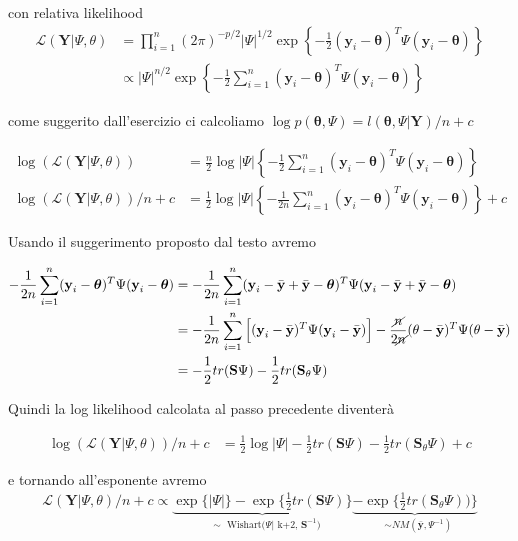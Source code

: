 con relativa likelihood
\begin{align*}
\mathcal{L}(\textbf{Y}|\Psi,\theta) &= \prod_{i=1}^n(2\pi)^{-p/2}|\Psi|^{1/2}\exp\left\{-\frac{1}{2}(\textbf{y}_i-\boldsymbol{\theta})^T\Psi(\textbf{y}_i-\boldsymbol{\theta})\right\}\\
&\propto |\Psi|^{n/2}\exp\left\{-\frac{1}{2}\sum_{i=1}^n(\textbf{y}_i-\boldsymbol{\theta})^T\Psi(\textbf{y}_i-\boldsymbol{\theta})\right\}
\end{align*}

come suggerito dall'esercizio ci calcoliamo $\log p(\boldsymbol{\theta},\Psi) = l(\boldsymbol{\theta},\Psi|\textbf{Y})/n+c$

\begin{align*}
\log(\mathcal{L}(\textbf{Y}|\Psi,\theta)) &=  \frac{n}{2}\log|\Psi|\left\{-\frac{1}{2}\sum_{i=1}^n(\textbf{y}_i-\boldsymbol{\theta})^T\Psi(\textbf{y}_i-\boldsymbol{\theta})\right\}\\
\log(\mathcal{L}(\textbf{Y}|\Psi,\theta))/n + c &=  \frac{1}{2}\log|\Psi|\left\{-\frac{1}{2n}\sum_{i=1}^n(\textbf{y}_i-\boldsymbol{\theta})^T\Psi(\textbf{y}_i-\boldsymbol{\theta})\right\} + c
\end{align*}

Usando il suggerimento proposto dal testo avremo

\begin{align*}
-\frac{1}{2n}\sum_{i=1}^n(\textbf{y}_i-\boldsymbol{\theta})^T\Psi(\textbf{y}_i-\boldsymbol{\theta}) &= -\frac{1}{2n}\sum_{i=1}^n(\textbf{y}_i - \bar{\textbf{y}}+\bar{\textbf{y}} - \boldsymbol{\theta})^T\Psi(\textbf{y}_i - \bar{\textbf{y}}+\bar{\textbf{y}} - \boldsymbol{\theta})\\
&=-\frac{1}{2n}\sum_{i=1}^n\Big[(\textbf{y}_i - \bar{\textbf{y}})^T\Psi(\textbf{y}_i - \bar{\textbf{y}})\Big] -\frac{\cancel{n}}{2\cancel{n}} (\theta - \bar{\textbf{y}})^T\Psi(\theta- \bar{\textbf{y}})\\
&=-\frac{1}{2}tr(\textbf{S}\Psi)-\frac{1}{2}tr(\textbf{S}_\theta\Psi)
\end{align*}

Quindi la log likelihood calcolata al passo precedente diventerà

\begin{align*}
\log(\mathcal{L}(\textbf{Y}|\Psi,\theta))/n + c &=  \frac{1}{2}\log|\Psi|-\frac{1}{2}tr(\textbf{S}\Psi)-\frac{1}{2}tr(\textbf{S}_\theta\Psi) + c
\end{align*}

e tornando all'esponente avremo
\begin{align*}
\mathcal{L}(\textbf{Y}|\Psi,\theta)/n + c \propto  \underbrace{\exp\{|\Psi|\}-\exp\Big\{\frac{1}{2}tr(\textbf{S}\Psi)\Big\}}_\text{ $\sim$  Wishart($\Psi|$ k+2, $\textbf{S}^{-1}$)}
\underbrace{-\exp\Big\{\frac{1}{2}tr(\textbf{S}_\theta\Psi))\Big\}}_\text{ $\sim NM(\bar{\textbf{y}},\Psi^{-1})$}
\end{align*}

